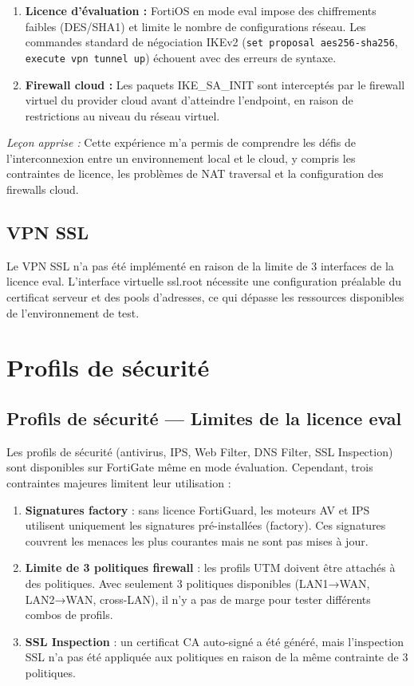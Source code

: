 \begin{enumerate}
    \item \textbf{Licence d'évaluation :} FortiOS en mode eval impose des chiffrements faibles (DES/SHA1) et limite le nombre de configurations réseau. Les commandes standard de négociation IKEv2 (\texttt{set proposal aes256-sha256}, \texttt{execute vpn tunnel up}) échouent avec des erreurs de syntaxe.
    \item \textbf{Firewall cloud :} Les paquets IKE\_SA\_INIT sont interceptés par le firewall virtuel du provider cloud avant d'atteindre l'endpoint, en raison de restrictions au niveau du réseau virtuel.
\end{enumerate}

\noindent\textit{Leçon apprise :} Cette expérience m'a permis de comprendre les défis de l'interconnexion entre un environnement local et le cloud, y compris les contraintes de licence, les problèmes de NAT traversal et la configuration des firewalls cloud.

\subsection{VPN SSL}

Le VPN SSL n'a pas été implémenté en raison de la limite de 3 interfaces de la licence eval. L'interface virtuelle ssl.root nécessite une configuration préalable du certificat serveur et des pools d'adresses, ce qui dépasse les ressources disponibles de l'environnement de test.

\section{Profils de sécurité}

\subsection{Profils de sécurité --- Limites de la licence eval}

Les profils de sécurité (antivirus, IPS, Web Filter, DNS Filter, SSL Inspection) sont disponibles sur FortiGate même en mode évaluation. Cependant, trois contraintes majeures limitent leur utilisation :

\begin{enumerate}
    \item \textbf{Signatures factory} : sans licence FortiGuard, les moteurs AV et IPS utilisent uniquement les signatures pré-installées (factory). Ces signatures couvrent les menaces les plus courantes mais ne sont pas mises à jour.
    \item \textbf{Limite de 3 politiques firewall} : les profils UTM doivent être attachés à des politiques. Avec seulement 3 politiques disponibles (LAN1→WAN, LAN2→WAN, cross-LAN), il n'y a pas de marge pour tester différents combos de profils.
    \item \textbf{SSL Inspection} : un certificat CA auto-signé a été généré, mais l'inspection SSL n'a pas été appliquée aux politiques en raison de la même contrainte de 3 politiques.
\end{enumerate}


